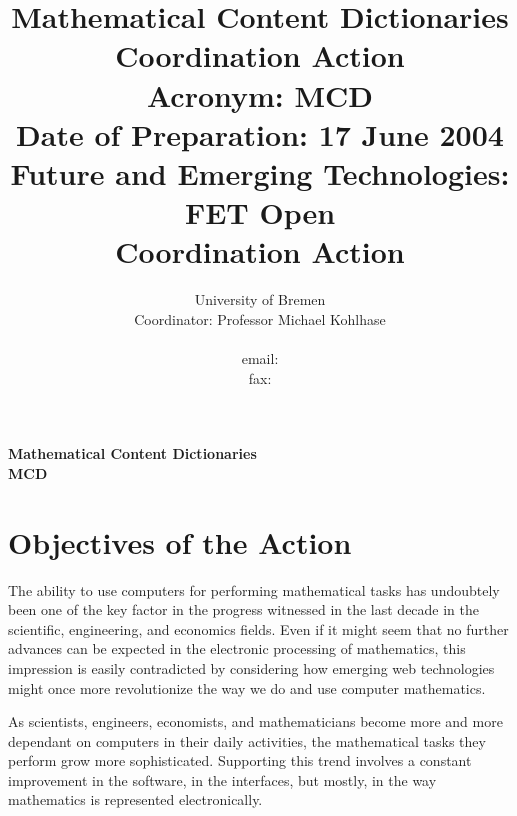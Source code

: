 \documentclass{euproposal}
\begin{document}
\setcounter{part}{2}%


\title{Mathematical Content Dictionaries Coordination Action\\
  Acronym: MCD\\
  Date of Preparation: 17 June 2004\\
  Future and Emerging Technologies: FET Open\\
  Coordination Action}
\author{University of Bremen\\
  Coordinator: Professor Michael Kohlhase\\
  \\
  email: \texttt{}\\
  fax: } \titlepage \maketitle

\setcounter{tocdepth}{1}\tableofcontents\newpage
\begin{center}\bf
Mathematical Content Dictionaries\\
MCD
\end{center}
\newpage\setcounter{chapter}{0}

\chapter{Objectives of the Action}


\begin{quote}\sf
\end{quote}


The ability to use computers for performing mathematical tasks has
undoubtely been one of the key factor in the progress witnessed in the
last decade in the scientific, engineering, and economics fields. Even
if it might seem that no further advances can be expected in the
electronic processing of mathematics, this impression is easily
contradicted by considering how emerging web technologies might once
more revolutionize the way we do and use computer mathematics.

As scientists, engineers, economists, and mathematicians become more
and more dependant on computers in their daily activities, the
mathematical tasks they perform grow more sophisticated. Supporting
this trend involves a constant improvement in the software, in the
interfaces, but mostly, in the way mathematics is represented
electronically. 
\end{document}
